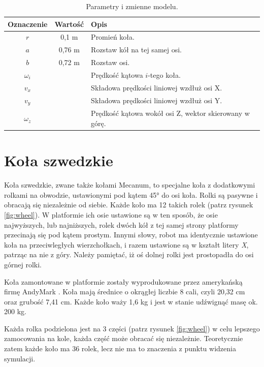	\begin{table}
		\centering
		\begin{tabular}{c c l}
		Oznaczenie & Wartość & Opis \\
		\hline
		$r$ & 0,1 \si{\metre} & Promień koła. \\
		$a$ & 0,76 \si{\metre} & Rozstaw kół na tej samej osi. \\
		$b$ & 0,72 \si{\metre} & Rozstaw osi. \\
		$\omega_i$ & & Prędkość kątowa $i$-tego koła. \\
		$v_x$ & & Składowa prędkości liniowej wzdłuż osi X. \\
		$v_y$ & & Składowa prędkości liniowej wzdłuż osi Y. \\
		$\omega_z$ & & Prędkość kątowa wokół osi Z, wektor skierowany w górę. \\
		\end{tabular}
		\caption{Parametry i zmienne modelu.}
		\label{tab:dims}
	\end{table}
	
\section{Koła szwedzkie}
	Koła szwedzkie, zwane także kołami Mecanum, to specjalne koła z dodatkowymi rolkami na obwodzie, ustawionymi pod kątem \ang{45} do osi koła.
	Rolki są pasywne i obracają się niezależnie od siebie. Każde koło ma 12 takich rolek (patrz rysunek \ref{fig:wheel}).
	W platformie ich osie ustawione są w ten sposób, że osie najwyższych, lub najniższych, rolek dwóch kół z tej samej strony platformy przecinają się pod kątem prostym.
	Innymi słowy, robot ma identycznie ustawione koła na przeciwległych wierzchołkach, i razem ustawione są w kształt litery \emph{X}, patrząc na nie z góry.
	Należy pamiętać, iż oś dolnej rolki jest prostopadła do osi górnej rolki.

	Koła zamontowane w platformie zostały wyprodukowane przez amerykańską firmę AndyMark \cite{andymark}.
	Koła mają średnice o okrągłej liczbie 8 cali, czyli 20,32 \si{\centi\metre} oraz grubość 7,41 \si{\centi\metre}.
	Każde koło waży 1,6 \si{\kilo\gram} i jest w stanie udźwignąć masę ok. 200 \si{\kilo\gram}.
	
	Każda rolka podzielona jest na 3 części (patrz rysunek \ref{fig:wheel}) w celu lepszego zamocowania na kole, każda część może obracać się niezależnie.
	Teoretycznie zatem każde koło ma 36 rolek, lecz nie ma to znaczenia z punktu widzenia symulacji.

